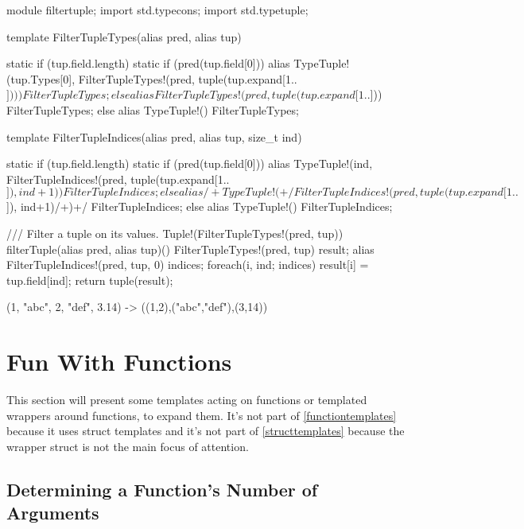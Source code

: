 \begin{dcode}
module filtertuple;
import std.typecons;
import std.typetuple;

template FilterTupleTypes(alias pred, alias tup)
{
    static if (tup.field.length)
    {
        static if (pred(tup.field[0]))
            alias TypeTuple!(tup.Types[0], FilterTupleTypes!(pred, tuple(tup.expand[1..$]))) 
                  FilterTupleTypes;
        else
            alias FilterTupleTypes!(pred, tuple(tup.expand[1..$]))               
                  FilterTupleTypes;
    }
    else
    {
        alias TypeTuple!() FilterTupleTypes;
    }

}

template FilterTupleIndices(alias pred, alias tup, size_t ind)
{
    static if (tup.field.length)
    {
        static if (pred(tup.field[0]))
            alias TypeTuple!(ind, FilterTupleIndices!(pred, tuple(tup.expand[1..$]), ind+1)) FilterTupleIndices;
        else
            alias /+TypeTuple!(+/FilterTupleIndices!(pred, tuple(tup.expand[1..$]), ind+1)/+)+/ FilterTupleIndices;
    }
    else
    {
        alias TypeTuple!() FilterTupleIndices;
    }

}

/// Filter a tuple on its values.
Tuple!(FilterTupleTypes!(pred, tup)) filterTuple(alias pred, alias tup)()
{
    FilterTupleTypes!(pred, tup) result;
    alias FilterTupleIndices!(pred, tup, 0) indices;
    foreach(i, ind; indices)
    {
        result[i] = tup.field[ind];
    }
    return tuple(result);
}
\end{dcode}

\begin{dcode}
(1, "abc", 2, "def", 3.14)
->
((1,2),("abc","def"),(3,14))
\end{dcode}

\section{Fun With Functions}\label{funwithfunctions}

This section will present some templates acting on functions or templated wrappers around functions, to expand them. It's not part of \autoref{functiontemplates} because it uses struct templates and it's not part of \autoref{structtemplates} because the wrapper struct is not the main focus of attention.

\subsection{Determining a Function's Number of Arguments}\label{arity}

